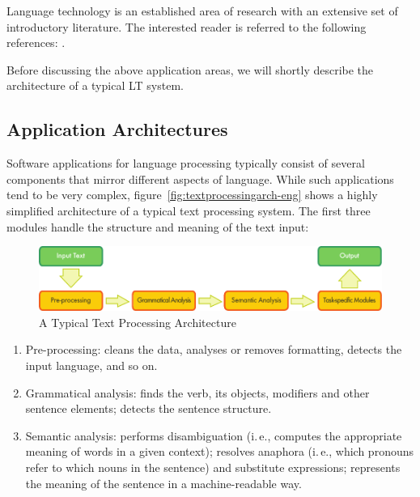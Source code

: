 \begin{multicols}{2}
Language technology is an established area of research with an extensive set of introductory literature. The interested reader is referred to the following references: \cite{carstensen-etal1, jurafsky-martin01, manning-schuetze1, lt-world1, lt-survey1}.

Before discussing the above application areas, we will shortly describe the architecture of a typical LT system.

\subsection{Application Architectures}

Software applications for language processing typically consist of several components that mirror different aspects of language.  While such applications tend to be very complex, figure~\ref{fig:textprocessingarch-eng} shows a highly simplified architecture of a typical text processing system. The first three modules handle the structure and meaning of the text input:

\begin{figure}[b]
  \center
  \includegraphics[width=\textwidth]{../_media/english/text_processing_app_architecture}
  \caption{A Typical Text Processing Architecture}
\label{fig:textprocessingarch_en}
\end{figure}

\begin{enumerate}
\item Pre-processing: cleans the data, analyses or removes formatting,
detects the input language, and so on.

\item Grammatical analysis: finds the verb, its objects, modifiers and
other sentence elements; detects the sentence structure.

\item Semantic analysis: performs disambiguation (i.\,e., computes the
appropriate meaning of words in a given context); resolves anaphora
(i.\,e., which pronouns refer to which nouns in the sentence) and
substitute expressions; represents the meaning of the sentence in
a machine-readable way.
\end{enumerate}


\end{multicols}
